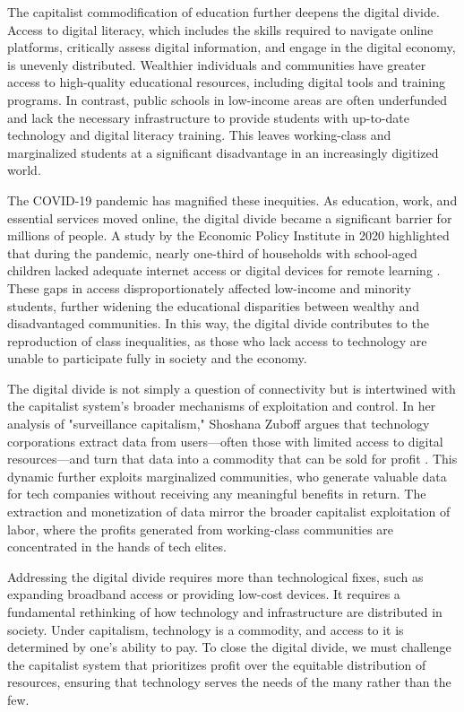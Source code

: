 \begin{refsection}
The capitalist commodification of education further deepens the digital divide. Access to digital literacy, which includes the skills required to navigate online platforms, critically assess digital information, and engage in the digital economy, is unevenly distributed. Wealthier individuals and communities have greater access to high-quality educational resources, including digital tools and training programs. In contrast, public schools in low-income areas are often underfunded and lack the necessary infrastructure to provide students with up-to-date technology and digital literacy training. This leaves working-class and marginalized students at a significant disadvantage in an increasingly digitized world.

The COVID-19 pandemic has magnified these inequities. As education, work, and essential services moved online, the digital divide became a significant barrier for millions of people. A study by the Economic Policy Institute in 2020 highlighted that during the pandemic, nearly one-third of households with school-aged children lacked adequate internet access or digital devices for remote learning \cite[pp.~12-14]{garcia2020}. These gaps in access disproportionately affected low-income and minority students, further widening the educational disparities between wealthy and disadvantaged communities. In this way, the digital divide contributes to the reproduction of class inequalities, as those who lack access to technology are unable to participate fully in society and the economy.

The digital divide is not simply a question of connectivity but is intertwined with the capitalist system’s broader mechanisms of exploitation and control. In her analysis of "surveillance capitalism," Shoshana Zuboff argues that technology corporations extract data from users—often those with limited access to digital resources—and turn that data into a commodity that can be sold for profit \cite[pp.~90-92]{zuboff2020}. This dynamic further exploits marginalized communities, who generate valuable data for tech companies without receiving any meaningful benefits in return. The extraction and monetization of data mirror the broader capitalist exploitation of labor, where the profits generated from working-class communities are concentrated in the hands of tech elites.

Addressing the digital divide requires more than technological fixes, such as expanding broadband access or providing low-cost devices. It requires a fundamental rethinking of how technology and infrastructure are distributed in society. Under capitalism, technology is a commodity, and access to it is determined by one’s ability to pay. To close the digital divide, we must challenge the capitalist system that prioritizes profit over the equitable distribution of resources, ensuring that technology serves the needs of the many rather than the few.


\end{refsection}
